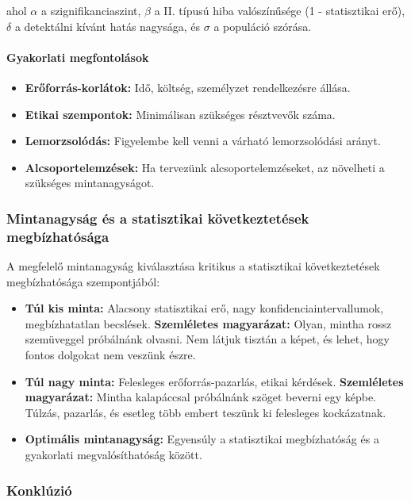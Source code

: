 \documentclass[a4paper,12pt]{article}
\begin{document}
    ahol $\alpha$ a szignifikanciaszint, $\beta$ a II. típusú hiba valószínűsége (1 - statisztikai erő), $\delta$ a detektálni kívánt hatás nagysága, és $\sigma$ a populáció szórása.

    \paragraph{Gyakorlati megfontolások}

    \begin{itemize}
        \item \textbf{Erőforrás-korlátok:} Idő, költség, személyzet rendelkezésre állása.
        \item \textbf{Etikai szempontok:} Minimálisan szükséges résztvevők száma.
        \item \textbf{Lemorzsolódás:} Figyelembe kell venni a várható lemorzsolódási arányt.
        \item \textbf{Alcsoportelemzések:} Ha tervezünk alcsoportelemzéseket, az növelheti a szükséges mintanagyságot.
    \end{itemize}

    \subsubsection{Mintanagyság és a statisztikai következtetések megbízhatósága}

    A megfelelő mintanagyság kiválasztása kritikus a statisztikai következtetések megbízhatósága szempontjából:

    \begin{itemize}
        \item \textbf{Túl kis minta:} Alacsony statisztikai erő, nagy konfidenciaintervallumok, megbízhatatlan becslések.
        \textbf{Szemléletes magyarázat:} Olyan, mintha rossz szemüveggel próbálnánk olvasni. Nem látjuk tisztán a képet, és lehet, hogy fontos dolgokat nem veszünk észre.
        \item \textbf{Túl nagy minta:} Felesleges erőforrás-pazarlás, etikai kérdések.
        \textbf{Szemléletes magyarázat:} Mintha kalapáccsal próbálnánk szöget beverni egy képbe. Túlzás, pazarlás, és esetleg több embert teszünk ki felesleges kockázatnak.
        \item \textbf{Optimális mintanagyság:} Egyensúly a statisztikai megbízhatóság és a gyakorlati megvalósíthatóság között.
    \end{itemize}

    \subsubsection{Konklúzió}
\end{document}
